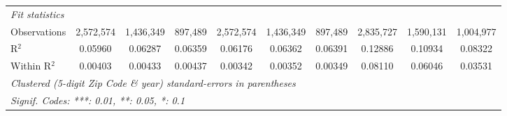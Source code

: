 \begin{tabular}{lccccccccc}
   \midrule
   \emph{Fit statistics}\\
   Observations                                               & 2,572,574      & 1,436,349      & 897,489        & 2,572,574     & 1,436,349      & 897,489       & 2,835,727    & 1,590,131     & 1,004,977\\  
   R$^2$                                                      & 0.05960        & 0.06287        & 0.06359        & 0.06176       & 0.06362        & 0.06391       & 0.12886      & 0.10934       & 0.08322\\  
   Within R$^2$                                               & 0.00403        & 0.00433        & 0.00437        & 0.00342       & 0.00352        & 0.00349       & 0.08110      & 0.06046       & 0.03531\\  
   \midrule \midrule
   \multicolumn{10}{l}{\emph{Clustered (5-digit Zip Code \& year) standard-errors in parentheses}}\\
   \multicolumn{10}{l}{\emph{Signif. Codes: ***: 0.01, **: 0.05, *: 0.1}}\\
\end{tabular}
\par\endgroup
